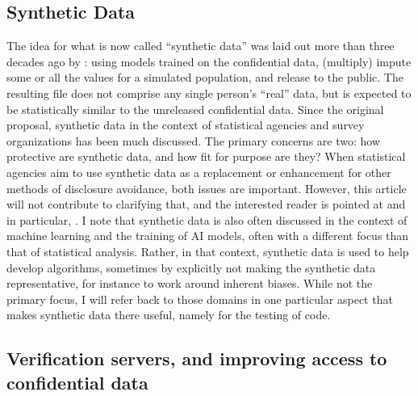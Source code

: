 \documentclass[inline]{hdsr}
\begin{document}

\subsection{Synthetic Data}

The idea for what is now called ``synthetic data'' was laid out more than three decades ago by \citet{rubin_discussion_1993}: using models trained on the confidential data, (multiply) impute some or all the values for a simulated population, and release to the public. The resulting file does not comprise any single person's ``real'' data, but is expected to be statistically similar to the unreleased confidential data. Since the original proposal, synthetic data in the context of statistical agencies and survey organizations has been much discussed. The primary concerns are two: how protective are synthetic data, and how fit for purpose are they? When statistical agencies aim to use synthetic data as a replacement or enhancement for other methods of disclosure avoidance, both issues are important. However, this article will not contribute to clarifying that, and the interested reader is pointed at \citet{raghunathan_synthetic_2021,reiter_synthetic_2023} and in particular, \citet{raghunathan_roadmap_2023b,raghu-nber-2024}. I note that synthetic data is also often discussed in the context of machine learning and the training of AI models, often with a different focus than that of statistical analysis. Rather, in that context, synthetic data is used to help develop algorithms, sometimes by explicitly not making the synthetic data representative, for instance to work around inherent biases. While not the primary focus, I will refer back to those domains in one particular aspect that makes synthetic data there useful, namely for the testing of code. 

\subsection{Verification servers, and improving access to confidential data}
\label{sec1}
\end{document}

